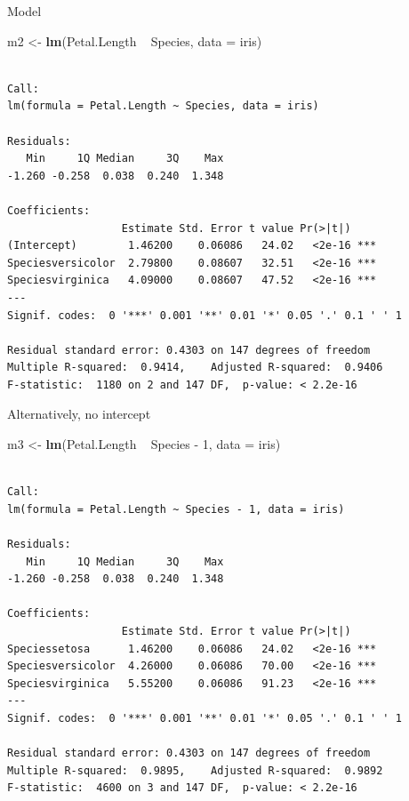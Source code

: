 \documentclass[10pt,ignorenonframetext,]{beamer}
\newenvironment{Shaded}{\begin{snugshade}}{\end{snugshade}}
\newcommand{\KeywordTok}[1]{\textcolor[rgb]{0.13,0.29,0.53}{\textbf{{#1}}}}
\newcommand{\DataTypeTok}[1]{\textcolor[rgb]{0.13,0.29,0.53}{{#1}}}
\newcommand{\DecValTok}[1]{\textcolor[rgb]{0.00,0.00,0.81}{{#1}}}
\newcommand{\StringTok}[1]{\textcolor[rgb]{0.31,0.60,0.02}{{#1}}}
\newcommand{\NormalTok}[1]{{#1}}
\begin{document}
\begin{frame}[fragile]{Model}

\begin{Shaded}
\begin{Highlighting}[]
\NormalTok{m2 <-}\StringTok{ }\KeywordTok{lm}\NormalTok{(Petal.Length ~}\StringTok{ }\NormalTok{Species, }\DataTypeTok{data =} \NormalTok{iris)}
\end{Highlighting}
\end{Shaded}

\begin{verbatim}

Call:
lm(formula = Petal.Length ~ Species, data = iris)

Residuals:
   Min     1Q Median     3Q    Max 
-1.260 -0.258  0.038  0.240  1.348 

Coefficients:
                  Estimate Std. Error t value Pr(>|t|)    
(Intercept)        1.46200    0.06086   24.02   <2e-16 ***
Speciesversicolor  2.79800    0.08607   32.51   <2e-16 ***
Speciesvirginica   4.09000    0.08607   47.52   <2e-16 ***
---
Signif. codes:  0 '***' 0.001 '**' 0.01 '*' 0.05 '.' 0.1 ' ' 1

Residual standard error: 0.4303 on 147 degrees of freedom
Multiple R-squared:  0.9414,    Adjusted R-squared:  0.9406 
F-statistic:  1180 on 2 and 147 DF,  p-value: < 2.2e-16
\end{verbatim}

\end{frame}

\begin{frame}[fragile]{Alternatively, no intercept}

\begin{Shaded}
\begin{Highlighting}[]
\NormalTok{m3 <-}\StringTok{ }\KeywordTok{lm}\NormalTok{(Petal.Length ~}\StringTok{ }\NormalTok{Species -}\StringTok{ }\DecValTok{1}\NormalTok{, }\DataTypeTok{data =} \NormalTok{iris)}
\end{Highlighting}
\end{Shaded}

\begin{verbatim}

Call:
lm(formula = Petal.Length ~ Species - 1, data = iris)

Residuals:
   Min     1Q Median     3Q    Max 
-1.260 -0.258  0.038  0.240  1.348 

Coefficients:
                  Estimate Std. Error t value Pr(>|t|)    
Speciessetosa      1.46200    0.06086   24.02   <2e-16 ***
Speciesversicolor  4.26000    0.06086   70.00   <2e-16 ***
Speciesvirginica   5.55200    0.06086   91.23   <2e-16 ***
---
Signif. codes:  0 '***' 0.001 '**' 0.01 '*' 0.05 '.' 0.1 ' ' 1

Residual standard error: 0.4303 on 147 degrees of freedom
Multiple R-squared:  0.9895,    Adjusted R-squared:  0.9892 
F-statistic:  4600 on 3 and 147 DF,  p-value: < 2.2e-16
\end{verbatim}

\end{frame}
\end{document}
